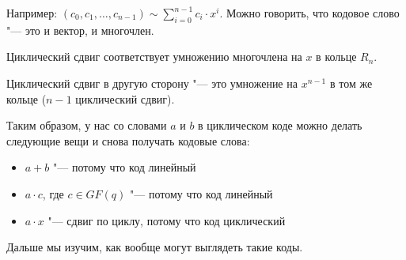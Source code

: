 Например: $(c_0, c_1, \dots, c_{n-1}) \sim \sum_{i=0}^{n-1} c_i\cdot x^i$.
Можно говорить, что кодовое слово "--- это и вектор, и многочлен.

\begin{lemma}
	Циклический сдвиг соответствует умножению многочлена на $x$ в кольце $R_n$.
\end{lemma}
\begin{Rem}
	Циклический сдвиг в другую сторону "--- это умножение на $x^{n-1}$ в том же кольце
	($n-1$ циклический сдвиг).
\end{Rem}

Таким образом, у нас со словами $a$ и $b$ в циклическом коде можно делать следующие вещи
и снова получать кодовые слова:
\begin{itemize}
\item $a+b$ "--- потому что код линейный
\item $a\cdot c$, где $c \in GF(q)$ "--- потому что код линейный
\item $a\cdot x$ "--- сдвиг по циклу, потому что код циклический
\end{itemize}
Дальше мы изучим, как вообще могут выглядеть такие коды.
